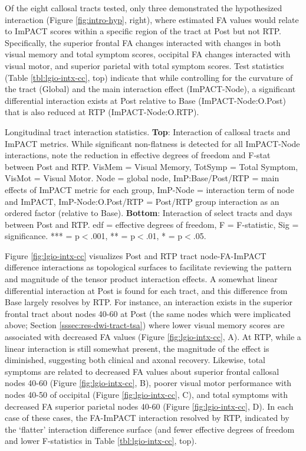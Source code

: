 \documentclass[12pt]{article}
\begin{document}
Of the eight callosal tracts tested, only three demonstrated the hypothesized interaction (Figure \ref{fig:intro-hyp}, right), where estimated FA values would relate to ImPACT scores within a specific region of the tract at Post but not RTP. Specifically, the superior frontal FA changes interacted with changes in both visual memory and total symptom scores, occipital FA changes interacted with visual motor, and superior parietal with total symptom scores. Test statistics (Table \ref{tbl:lgio-intx-cc}, top) indicate that while controlling for the curvature of the tract (Global) and the main interaction effect (ImPACT-Node), a significant differential interaction exists at Post relative to Base (ImPACT-Node:O.Post) that is also reduced at RTP (ImPACT-Node:O.RTP).

\begin{table}[H]
	\scriptsize
	
	\caption{Longitudinal tract interaction statistics. \textbf{Top}: Interaction of callosal tracts and ImPACT metrics. While significant non-flatness is detected for all ImPACT-Node interactions, note the reduction in effective degrees of freedom and F-stat between Post and RTP. VisMem = Visual Memory, TotSymp = Total Symptom, VisMot = Visual Motor. Node = global node, ImP:Base/Post/RTP = main effects of ImPACT metric for each group, ImP-Node = interaction term of node and ImPACT, ImP-Node:O.Post/RTP = Post/RTP group interaction as an ordered factor (relative to Base). \textbf{Bottom}: Interaction of select tracts and days between Post and RTP. edf = effective degrees of freedom, F = F-statistic, Sig = significance. *** = p$<$.001, ** = p$<$.01, * = p$<$.05.}
	\label{tbl:lgio-intx-cc}
\end{table}

Figure \ref{fig:lgio-intx-cc} visualizes Post and RTP tract node-FA-ImPACT difference interactions as topological surfaces to facilitate reviewing the pattern and magnitude of the tensor product interaction effects. A somewhat linear differential interaction at Post is found for each tract, and this difference from Base largely resolves by RTP. For instance, an interaction exists in the superior frontal tract about nodes 40-60 at Post (the same nodes which were implicated above; Section \ref{sssec:res-dwi-tract-tsa}) where lower visual memory scores are associated with decreased FA values (Figure \ref{fig:lgio-intx-cc}, A). At RTP, while a linear interaction is still somewhat present, the magnitude of the effect is diminished, suggesting both clinical and axonal recovery. Likewise, total symptoms are related to decreased FA values about superior frontal callosal nodes 40-60 (Figure \ref{fig:lgio-intx-cc}, B), poorer visual motor performance with nodes 40-50 of occipital (Figure \ref{fig:lgio-intx-cc}, C), and total symptoms with decreased FA superior parietal nodes 40-60 (Figure \ref{fig:lgio-intx-cc}, D). In each case of these cases, the FA-ImPACT interaction resolved by RTP, indicated by the `flatter' interaction difference surface (and fewer effective degrees of freedom and lower F-statistics in Table \ref{tbl:lgio-intx-cc}, top).
\end{document}
